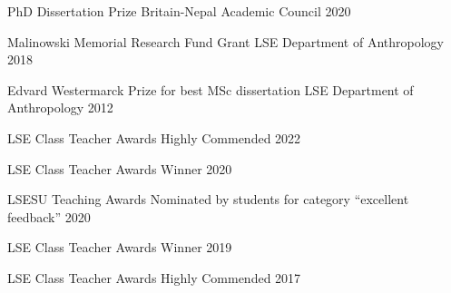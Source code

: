 


\begin{cvhonors}

  \cvhonor
    {PhD Dissertation Prize} %
    {Britain-Nepal Academic Council} %
    {} %
    {2020} %

  \cvhonor
    {Malinowski Memorial Research Fund Grant} %
    {LSE Department of Anthropology} %
    {} %
    {2018} %

  \cvhonor
    {Edvard Westermarck Prize for best MSc dissertation} %
    {LSE Department of Anthropology} %
    {} %
    {2012} %


\end{cvhonors}


\begin{cvhonors}

  \cvhonor
    {LSE Class Teacher Awards} %
    {Highly Commended} %
    {} %
    {2022} %

  \cvhonor
    {LSE Class Teacher Awards} %
    {Winner} %
    {} %
    {2020} %

  \cvhonor
    {LSESU Teaching Awards} %
    {Nominated by students for category ``excellent feedback''} %
    {} %
    {2020} %

  \cvhonor
    {LSE Class Teacher Awards} %
    {Winner} %
    {} %
    {2019} %

  \cvhonor
    {LSE Class Teacher Awards} %
    {Highly Commended} %
    {} %
    {2017} %

\end{cvhonors}
